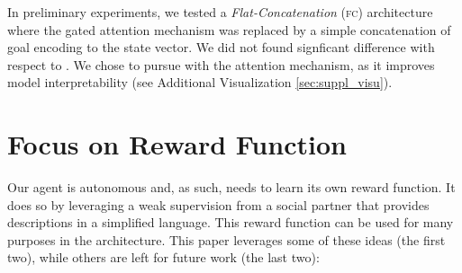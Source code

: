 In preliminary experiments, we tested a \textit{Flat-Concatenation} (\textsc{fc}\xspace) architecture where the gated attention mechanism was replaced by a simple concatenation of goal encoding to the state vector. We did not found signficant difference with respect to \FA. We chose to pursue with the attention mechanism, as it improves model interpretability (see Additional Visualization \ref{sec:suppl_visu}).



\clearpage
\section{Focus on Reward Function}
\label{sec:suppl_reward}
Our \imagine agent is autonomous and, as such, needs to learn its own reward function. It does so by leveraging a weak supervision from a social partner that provides descriptions in a simplified language. This reward function can be used for many purposes in the architecture. This paper leverages some of these ideas (the first two), while others are left for future work (the last two):

